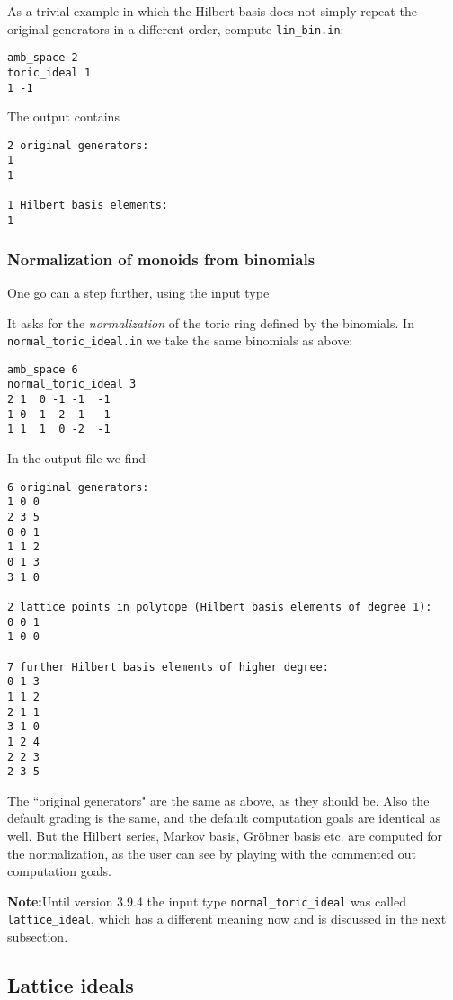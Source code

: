 As a trivial example in which the Hilbert basis does not simply repeat the original generators in a different order, compute \verb|lin_bin.in|:
\begin{Verbatim}
amb_space 2
toric_ideal 1
1 -1
\end{Verbatim}
The output contains
\begin{Verbatim}
2 original generators:
1
1

1 Hilbert basis elements:
1
\end{Verbatim}

\subsubsection{Normalization of monoids from binomials}\label{normal_toric_ideal}

One go can a step further, using the input type
\begin{itemize}
\end{itemize}
It asks for the \emph{normalization} of the toric ring defined by the binomials. In \verb|normal_toric_ideal.in| we take the same binomials  as above:
\begin{Verbatim}
amb_space 6
normal_toric_ideal 3
2 1  0 -1 -1  -1
1 0 -1  2 -1  -1
1 1  1  0 -2  -1
\end{Verbatim}
In the output file we find
\begin{Verbatim}
6 original generators:
1 0 0
2 3 5
0 0 1
1 1 2
0 1 3
3 1 0

2 lattice points in polytope (Hilbert basis elements of degree 1):
0 0 1
1 0 0

7 further Hilbert basis elements of higher degree:
0 1 3
1 1 2
2 1 1
3 1 0
1 2 4
2 2 3
2 3 5
\end{Verbatim}
The ``original generators" are the same as above, as they should be. Also the default grading is the same, and the default computation goals are identical as well. But the Hilbert series, Markov basis, Gröbner basis etc. are computed for the normalization, as the user can see by playing with the commented out computation goals.

\textbf{Note:}\enspace Until version 3.9.4 the input type \verb|normal_toric_ideal| was called \verb|lattice_ideal|, which has a different meaning now and is discussed in the next subsection.

\subsection{Lattice ideals}\label{lattice_ideal}

